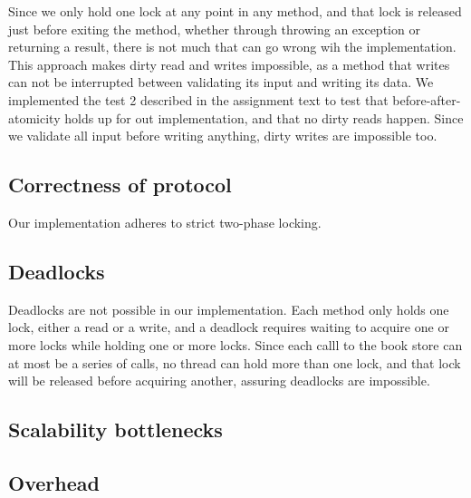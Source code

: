 \documentclass{article}
\theoremstyle{plain}
\theoremstyle{nonumberplain}
\begin{document}
Since we only hold one lock at any point in any method, and that lock is released just before exiting the method, whether through throwing an exception or returning a result, there is not much that can go wrong wih the implementation. This approach makes dirty read and writes impossible, as a method that writes can not be interrupted between validating its input and writing its data. We implemented the test  2 described in the assignment text to test that before-after-atomicity holds up for out implementation, and that no dirty reads happen. Since we validate all input before writing anything, dirty writes are impossible too.

\subsection{Correctness of protocol}

Our implementation adheres to strict two-phase locking. 

\subsection{Deadlocks}

Deadlocks are not possible in our implementation. Each method only holds one lock, either a read or a write, and a deadlock requires waiting to acquire one or more locks while holding one or more locks. Since each calll to the book store can at most be a series of calls, no thread can hold more than one lock, and that lock will be released before acquiring another, assuring deadlocks are impossible.

\subsection{Scalability bottlenecks}



\subsection{Overhead}
\end{document}
